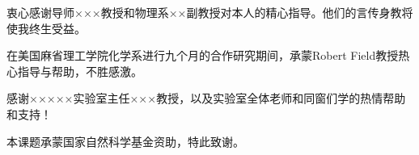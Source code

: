 \begin{acknowledgements}

衷心感谢导师×××教授和物理系××副教授对本人的精心指导。他们的言传身教将使我终生受益。

在美国麻省理工学院化学系进行九个月的合作研究期间，承蒙Robert Field教授热心指导与帮助，不胜感激。

感谢×××××实验室主任×××教授，以及实验室全体老师和同窗们学的热情帮助和支持！

本课题承蒙国家自然科学基金资助，特此致谢。

\end{acknowledgements}
